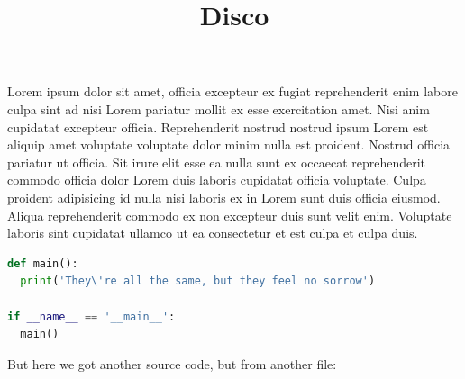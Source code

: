 \documentclass{article}
\begin{document}
\title{Disco}

Lorem ipsum dolor sit amet, officia excepteur ex fugiat reprehenderit enim
labore culpa sint ad nisi Lorem pariatur mollit ex esse exercitation amet. Nisi
anim cupidatat excepteur officia. Reprehenderit nostrud nostrud ipsum Lorem est
aliquip amet voluptate voluptate dolor minim nulla est proident. Nostrud
officia pariatur ut officia. Sit irure elit esse ea nulla sunt ex occaecat
reprehenderit commodo officia dolor Lorem duis laboris cupidatat officia
voluptate. Culpa proident adipisicing id nulla nisi laboris ex in Lorem sunt
duis officia eiusmod. Aliqua reprehenderit commodo ex non excepteur duis sunt
velit enim. Voluptate laboris sint cupidatat ullamco ut ea consectetur et est
culpa et culpa duis.

\begin{lstlisting}[language=Python]
def main():
  print('They\'re all the same, but they feel no sorrow')

if __name__ == '__main__':
  main()
\end{lstlisting}

\par But here we got another source code, but from another file:

\lstset{escapechar=@,style=customc}

\end{document}
